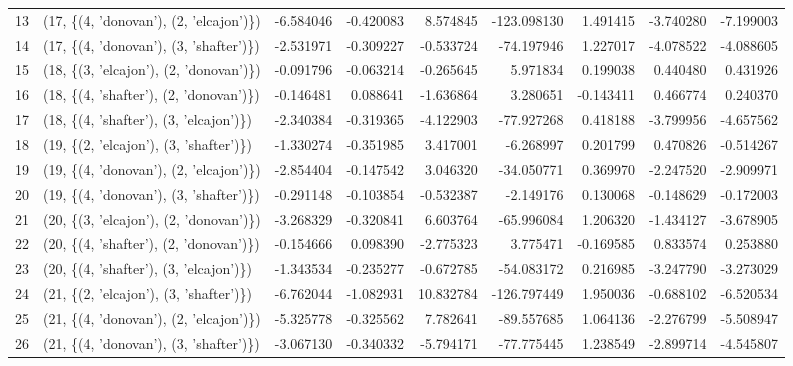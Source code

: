 \begin{tabular}{llrrrrrrr}
13 &  (17, \{(4, 'donovan'), (2, 'elcajon')\}) & -6.584046 &  -0.420083 &   8.574845 & -123.098130 &  1.491415 &  -3.740280 & -7.199003 \\
14 &  (17, \{(4, 'donovan'), (3, 'shafter')\}) & -2.531971 &  -0.309227 &  -0.533724 &  -74.197946 &  1.227017 &  -4.078522 & -4.088605 \\
15 &  (18, \{(3, 'elcajon'), (2, 'donovan')\}) & -0.091796 &  -0.063214 &  -0.265645 &    5.971834 &  0.199038 &   0.440480 &  0.431926 \\
16 &  (18, \{(4, 'shafter'), (2, 'donovan')\}) & -0.146481 &   0.088641 &  -1.636864 &    3.280651 & -0.143411 &   0.466774 &  0.240370 \\
17 &  (18, \{(4, 'shafter'), (3, 'elcajon')\}) & -2.340384 &  -0.319365 &  -4.122903 &  -77.927268 &  0.418188 &  -3.799956 & -4.657562 \\
18 &  (19, \{(2, 'elcajon'), (3, 'shafter')\}) & -1.330274 &  -0.351985 &   3.417001 &   -6.268997 &  0.201799 &   0.470826 & -0.514267 \\
19 &  (19, \{(4, 'donovan'), (2, 'elcajon')\}) & -2.854404 &  -0.147542 &   3.046320 &  -34.050771 &  0.369970 &  -2.247520 & -2.909971 \\
20 &  (19, \{(4, 'donovan'), (3, 'shafter')\}) & -0.291148 &  -0.103854 &  -0.532387 &   -2.149176 &  0.130068 &  -0.148629 & -0.172003 \\
21 &  (20, \{(3, 'elcajon'), (2, 'donovan')\}) & -3.268329 &  -0.320841 &   6.603764 &  -65.996084 &  1.206320 &  -1.434127 & -3.678905 \\
22 &  (20, \{(4, 'shafter'), (2, 'donovan')\}) & -0.154666 &   0.098390 &  -2.775323 &    3.775471 & -0.169585 &   0.833574 &  0.253880 \\
23 &  (20, \{(4, 'shafter'), (3, 'elcajon')\}) & -1.343534 &  -0.235277 &  -0.672785 &  -54.083172 &  0.216985 &  -3.247790 & -3.273029 \\
24 &  (21, \{(2, 'elcajon'), (3, 'shafter')\}) & -6.762044 &  -1.082931 &  10.832784 & -126.797449 &  1.950036 &  -0.688102 & -6.520534 \\
25 &  (21, \{(4, 'donovan'), (2, 'elcajon')\}) & -5.325778 &  -0.325562 &   7.782641 &  -89.557685 &  1.064136 &  -2.276799 & -5.508947 \\
26 &  (21, \{(4, 'donovan'), (3, 'shafter')\}) & -3.067130 &  -0.340332 &  -5.794171 &  -77.775445 &  1.238549 &  -2.899714 & -4.545807 \\
\bottomrule
\end{tabular}
